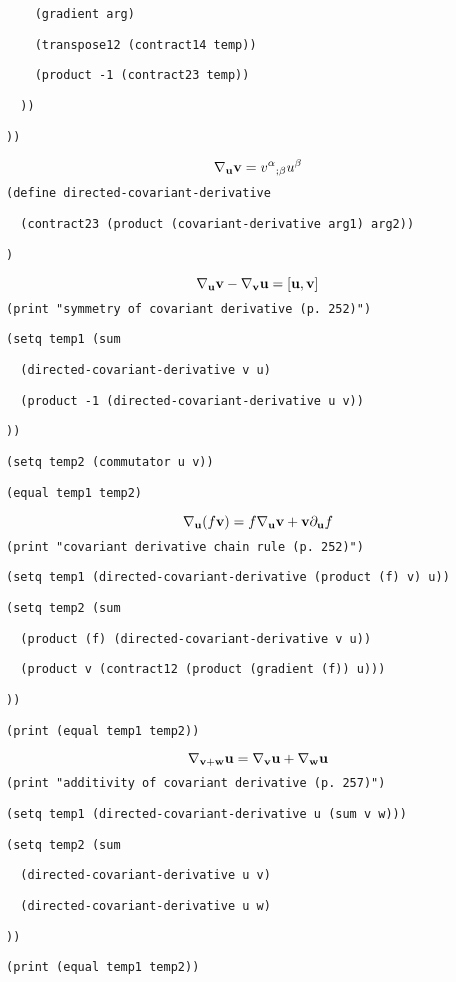 {\tt \ \ \ \ (gradient\ arg)}

{\tt \ \ \ \ (transpose12\ (contract14\ temp))}

{\tt \ \ \ \ (product\ -1\ (contract23\ temp))}

{\tt \ \ ))}

{\tt ))}

$$\nabla_{\bf u}{\bf v}={v^\alpha}_{;\beta}u^{\beta}$$
{\tt (define\ directed-covariant-derivative}

{\tt \ \ (contract23\ (product\ (covariant-derivative\ arg1)\ arg2))}

{\tt )}

$$\nabla_{\bf u}{\bf v}-\nabla_{\bf v}{\bf u}=[{\bf u},{\bf v}]$$
{\tt (print\ "symmetry\ of\ covariant\ derivative\ (p.\ 252)")}

{\tt (setq\ temp1\ (sum}

{\tt \ \ (directed-covariant-derivative\ v\ u)}

{\tt \ \ (product\ -1\ (directed-covariant-derivative\ u\ v))}

{\tt ))}

{\tt (setq\ temp2\ (commutator\ u\ v))}

{\tt (equal\ temp1\ temp2)}

$$\nabla_{\bf u}(f{\bf v})=
f\nabla_{\bf u}{\bf v}+{\bf v}\partial_{\bf u}f$$
{\tt (print\ "covariant\ derivative\ chain\ rule\ (p.\ 252)")}

{\tt (setq\ temp1\ (directed-covariant-derivative\ (product\ (f)\ v)\ u))}

{\tt (setq\ temp2\ (sum}

{\tt \ \ (product\ (f)\ (directed-covariant-derivative\ v\ u))}

{\tt \ \ (product\ v\ (contract12\ (product\ (gradient\ (f))\ u)))}

{\tt ))}

{\tt (print\ (equal\ temp1\ temp2))}

$$\nabla_{{\bf v}+{\bf w}}{\bf u}=
\nabla_{\bf v}{\bf u}+\nabla_{\bf w}{\bf u}$$
{\tt (print\ "additivity\ of\ covariant\ derivative\ (p.\ 257)")}

{\tt (setq\ temp1\ (directed-covariant-derivative\ u\ (sum\ v\ w)))}

{\tt (setq\ temp2\ (sum}

{\tt \ \ (directed-covariant-derivative\ u\ v)}

{\tt \ \ (directed-covariant-derivative\ u\ w)}

{\tt ))}

{\tt (print\ (equal\ temp1\ temp2))}

